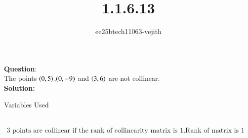 \documentclass[journal]{IEEEtran}
\begin{document}

\vspace{3cm}

\title{1.1.6.13}
\author{ee25btech11063-vejith}

\maketitle
{\let\newpage\relax\maketitle}
\renewcommand{\thefigure}{\theenumi}
\renewcommand{\thetable}{\theenumi}
\setlength{\intextsep}{10pt} %
\textbf{Question}:\\
The points $\left(0,5\right)$,$\left(0,-9\right)$ and $\left(3,6\right)$ are  not collinear.
\\
\textbf{Solution: }\\
\begin{table}[h!]    
  \centering
  
  \caption{Variables Used}
  \label{}
\end{table}\\
\begin{align}
\text{3 points are collinear if the rank of collinearity matrix is 1.Rank of matrix is 1 means no.of rows with non zero entries is 1.}    
\end{align}
\end{document}
